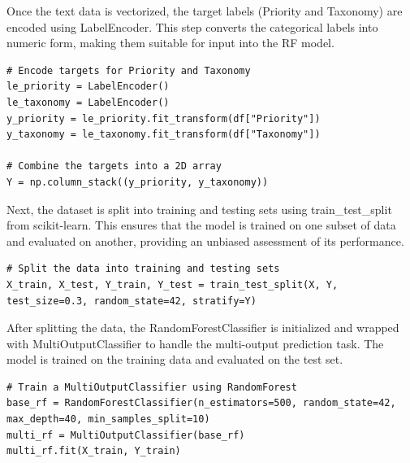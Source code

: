 Once the text data is vectorized, the target labels (Priority and Taxonomy) are encoded using LabelEncoder. 
This step converts the categorical labels into numeric form, making them suitable for input into the RF model.

\vspace{0.2cm}
\noindent
\begin{minipage}{\linewidth}
\begin{verbatim}
# Encode targets for Priority and Taxonomy
le_priority = LabelEncoder()
le_taxonomy = LabelEncoder()
y_priority = le_priority.fit_transform(df["Priority"])
y_taxonomy = le_taxonomy.fit_transform(df["Taxonomy"])

# Combine the targets into a 2D array
Y = np.column_stack((y_priority, y_taxonomy))
\end{verbatim}
\label{lst:encoding_target_labels}
\end{minipage}
\vspace{0.1cm}

Next, the dataset is split into training and testing sets using train\_test\_split from scikit-learn. 
This ensures that the model is trained on one subset of data and evaluated on another, providing an unbiased assessment of its performance.

\vspace{0.2cm}
\noindent
\begin{minipage}{\linewidth}
\begin{verbatim}
# Split the data into training and testing sets
X_train, X_test, Y_train, Y_test = train_test_split(X, Y, test_size=0.3, random_state=42, stratify=Y)
\end{verbatim}
\label{lst:splitting_dataset}
\end{minipage}
\vspace{0.1cm}

After splitting the data, the RandomForestClassifier is initialized and wrapped with MultiOutputClassifier to handle the multi-output prediction task. 
The model is trained on the training data and evaluated on the test set. 

\vspace{0.2cm}
\noindent
\begin{minipage}{\linewidth}
\begin{verbatim}
# Train a MultiOutputClassifier using RandomForest
base_rf = RandomForestClassifier(n_estimators=500, random_state=42, max_depth=40, min_samples_split=10)
multi_rf = MultiOutputClassifier(base_rf)
multi_rf.fit(X_train, Y_train)
\end{verbatim}
\label{lst:training_rf_model}
\end{minipage}
\vspace{0.1cm}

